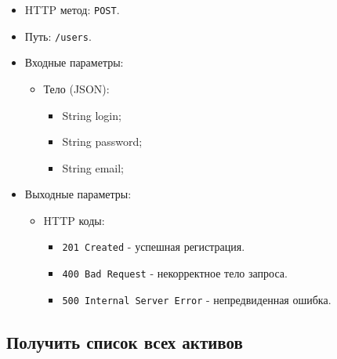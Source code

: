 \documentclass[a4paper, 14pt]{article}
\begin{document}
\begin{itemize}
    \item HTTP метод: \texttt{POST}.
    \item Путь: \texttt{/users}.
    \item Входные параметры:
    \begin{itemize}
        \item Тело (JSON):
        \begin{itemize}
            \item String login;
            \item String password;
            \item String email;
        \end{itemize}
    \end{itemize}
    \item Выходные параметры:
    \begin{itemize}
        \item HTTP коды:
        \begin{itemize}
            \item \texttt{201 Created} - успешная регистрация.
            \item \texttt{400 Bad Request} - некорректное тело запроса.
            \item \texttt{500 Internal Server Error} - непредвиденная ошибка.
        \end{itemize}
    \end{itemize}
\end{itemize}

\subsection{Получить список всех активов}
\end{document}
